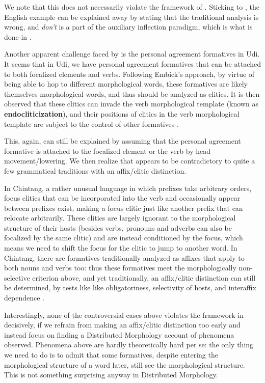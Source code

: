 \documentclass[a4paper, oneside, scheme=plain, 12pt]{article}
\newcommand*{\concept}[1]{\textbf{#1}}
\newcommand{\form}[1]{\emph{#1}}
\begin{document}
We note that this does not necessarily violate the framework of \citet{embick2007linearization}.
Sticking to \citet{embick2007linearization}, the English example can be explained away by stating that the traditional analysis is wrong, and \form{don't} is a part of the auxiliary inflection paradigm, which is what is done in \citet{cgel}.

Another apparent challenge faced by \citet{embick2007linearization} is the personal agreement formatives in Udi.
It seems that in Udi, we have personal agreement formatives
that can be attached to both focalized elements and verbs.
Following Embick's approach, by virtue of being able to hop to different morphological words, these formatives are likely themselves morphological words, and thus should be analyzed as clitics.
It is then observed that these clitics can invade the verb morphological template
(known as \concept{endocliticization}),
and their positions of clitics in the verb morphological template 
are subject to the control of other formatives \citep{harris2000word}.

This, again, can still be explained by assuming that the personal agreement formative is attached to the focalized element or the verb by head movement/lowering.
We then realize that \citet{embick2007linearization} appears to be contradictory to quite a few grammatical traditions with an affix/clitic distinction.

In Chintang, a rather unusual language in which prefixes take arbitrary orders,
focus clitics that can be incorporated into the verb and occasionally appear between prefixes exist,
making a focus clitic just like another prefix that can relocate arbitrarily.
These clitics are largely ignorant to the morphological structure of their hosts (besides verbs, pronouns and adverbs can also be focalized by the same clitic) and are instead conditioned by the focus, which means we need to shift the focus for the clitic to jump to another word.
In Chintang, there are formatives traditionally analyzed as affixes that apply to both nouns and verbs too:
thus these formatives meet the morphologically non-selective criterion above, and yet traditionally, an affix/clitic distinction can still be determined, by tests like like obligatoriness, selectivity of hosts, and interaffix dependence \citep{bickel2007free}.

Interestingly, none of the controversial cases above violates the framework in \citet{embick2007linearization} decisively, if we refrain from making an affix/clitic distinction too early and instead focus on finding a Distributed Morphology account of phenomena observed. 
Phenomena above are hardly theoretically hard per se:
the only thing we need to do is to admit that some formatives, despite entering the morphological structure of a word later,
still see the morphological structure.
This is not something surprising anyway in Distributed Morphology.
\end{document}
